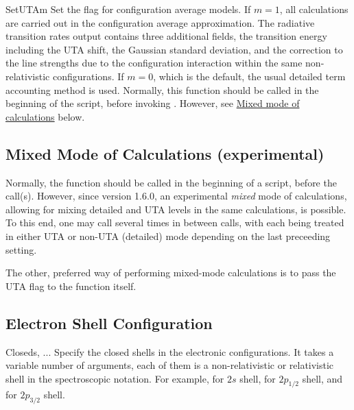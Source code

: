 \begin{fundesc}{SetUTA}{m}
Set the flag for configuration average models. If $m=1$, all calculations are
carried out in the configuration average approximation. The radiative transition
rates output contains three additional fields, the transition energy including
the UTA shift, the Gaussian standard deviation, and the correction to the line
strengths due to the configuration interaction within the same non-relativistic
configurations. If $m=0$, which is the default, the usual detailed term
accounting method is used. Normally, this function should be called in the
beginning of the script, before invoking . However, see
\hyperref[subsec:mixed_mode]{Mixed mode of calculations} below.

\subsection{Mixed Mode of Calculations (experimental)}
\label{subsec:mixed_mode}
Normally, the  function should be called in the beginning of a
script, before the  call(s). However, since version 1.6.0, an
experimental {\em mixed} mode of calculations, allowing for mixing detailed and
UTA levels in the same calculations, is possible. To this end, one may call
 several times in between  calls, with each
 being treated in either UTA or non-UTA (detailed) mode
depending on the last preceeding  setting.

The other, preferred way of performing mixed-mode calculations is to pass the
UTA flag to the  function itself.
\end{fundesc}

\subsection{Electron Shell Configuration}

\begin{fundesc}{Closed}{s, ...}
Specify the closed shells in the electronic configurations. It takes a variable
number of arguments, each of them is a non-relativistic or relativistic shell in
the spectroscopic notation. For example,  for $2s$ shell,  for
$2p_{1/2}$ shell, and  for $2p_{3/2}$ shell.
\end{fundesc}

